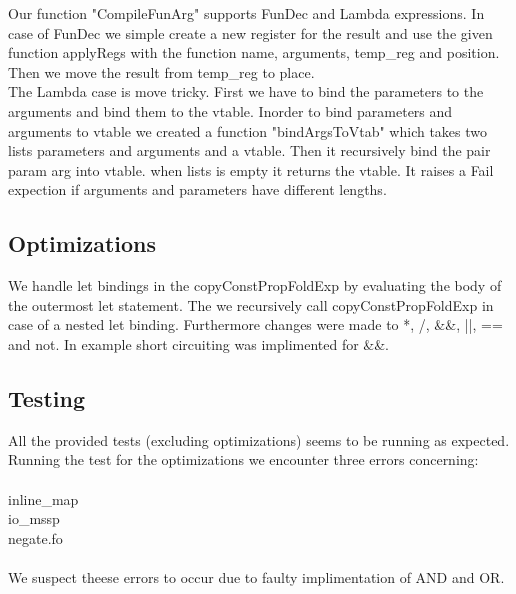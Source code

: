 \documentclass[12pt]{article}
\numberwithin{listing}{section}
\begin{document}
Our function "CompileFunArg" supports FunDec and Lambda expressions. In case of FunDec we simple create a new register for the result and use the given function applyRegs with the function name, arguments, temp\_reg and position. Then we move the result from temp\_reg to place.\\
The Lambda case is move tricky. First we have to bind the parameters to the arguments and bind them to the vtable. Inorder to bind parameters and arguments to vtable we created a function "bindArgsToVtab" which takes two lists parameters and arguments and a vtable. Then it recursively bind the pair param arg into vtable. when lists is empty it returns the vtable. It raises a Fail expection if arguments and parameters have different lengths.

\subsection*{Optimizations}
We handle let bindings in the copyConstPropFoldExp by evaluating the body of the outermost let statement. The we recursively call copyConstPropFoldExp in case of a nested let binding. Furthermore changes were made to *, /, \&\&, ||, == and not. In example short circuiting was implimented for \&\&.

\subsection*{Testing}
All the provided tests (excluding optimizations) seems to be running as expected. Running the test for the optimizations we encounter three errors concerning:
\\\\ inline\_map \\ io\_mssp \\ negate.fo \\\\
We suspect theese errors to occur due to faulty implimentation of AND and OR.




%
\end{document}
